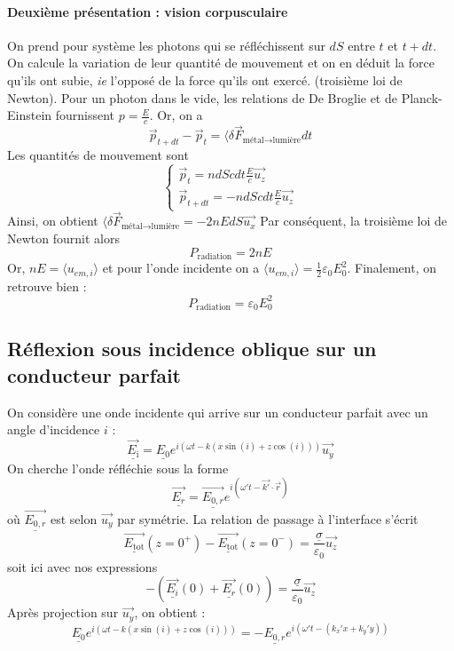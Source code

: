 \documentclass[french]{book}
\theoremstyle{plain}
\theoremstyle{definition}
\theoremstyle{remark}
\begin{document}
\paragraph{Deuxième présentation : vision corpusculaire} On prend pour système les photons qui se réfléchissent sur $dS$ entre $t$ et $t + dt$. On calcule la variation de leur quantité de mouvement et on en déduit la force qu’ils ont subie, \textit{ie}	l’opposé de la force qu’ils ont exercé. (troisième loi de Newton). Pour un photon dans le vide, les relations de De Broglie et de Planck-Einstein fournissent $p=\displaystyle\frac{E}{c}$. Or, on a $$\overrightarrow{p}_{t+dt}-\overrightarrow{p}_t=\langle\delta\overrightarrow{F}_{\text{métal}\to\text{lumière}}dt$$ Les quantités de mouvement sont $$\begin{cases}\overrightarrow{p}_t=ndScdt\frac{E}{c}\overrightarrow{u_z}\\\overrightarrow{p}_{t+dt}=-ndScdt\frac{E}{c}\overrightarrow{u_z}\end{cases}$$ Ainsi, on obtient $\langle\delta\overrightarrow{F}_{\text{métal}\to\text{lumière}}=-2nEdS\overrightarrow{u_x}$ Par conséquent, la troisième loi de Newton fournit alors $$P_\text{radiation}=2nE$$ Or, $nE=\langle u_{em,i}\rangle$ et pour l'onde incidente on a $\langle u_{em,i}\rangle=\frac{1}{2}\varepsilon_0E_0^2$. Finalement, on retrouve bien : $$P_\text{radiation}=\varepsilon_0E_0^2$$
\subsection{Réflexion sous incidence oblique sur un conducteur parfait}
On considère une onde incidente qui arrive sur un conducteur parfait avec un angle d'incidence $i$ : $$\underline{\overrightarrow{E_\text{i}}}=\underline{E_0}e^{i(\omega t-k(x\sin(i)+z\cos(i)))}\overrightarrow{u_y}$$ On cherche l'onde réfléchie sous la forme $$\underline{\overrightarrow{E_r}}=\underline{\overrightarrow{E_{0,r}}}e^{i(\omega't-\overrightarrow{k'}\cdot\overrightarrow{r})}$$ où $\underline{\overrightarrow{E_{0,r}}}$ est selon $\overrightarrow{u_y}$ par symétrie. La relation de passage à l'interface s'écrit $$\underline{\overrightarrow{E_\text{tot}}}(z=0^+)-\underline{\overrightarrow{E_\text{tot}}}(z=0^-)=\frac{\underline{\sigma}}{\varepsilon_0}\overrightarrow{u_z}$$ soit ici avec nos expressions $$-\left(\underline{\overrightarrow{E_i}}(0)+\underline{\overrightarrow{E_r}}(0)\right)=\frac{\underline{\sigma}}{\varepsilon_0}\overrightarrow{u_z}$$ Après projection sur $\overrightarrow{u_y}$, on obtient : $$\underline{E_0}e^{i(\omega t-k(x\sin(i)+z\cos(i)))}=-\underline{E_{0,r}}e^{i(\omega't-(k_x'x+k_y'y))}$$
\end{document}
